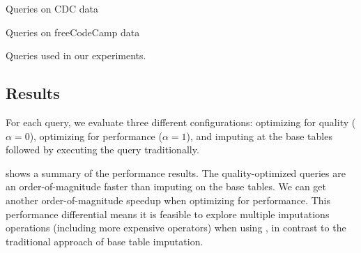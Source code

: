 \begin{table}
  \centering
  \begin{subtable}{\linewidth}
    
    \caption{Queries on CDC data}\label{fig:queries-cdc}
  \end{subtable}
  \par\medskip
  \begin{subtable}{\linewidth}
    
    \caption{Queries on freeCodeCamp data}\label{fig:queries-fcc}
  \end{subtable}
  \par\medskip
  \caption{Queries used in our experiments.}\label{fig:queries}
\end{table}

%  

\subsection{Results}\label{sec:results}

For each query, we evaluate three different configurations: \ProjectName{} optimizing for
quality ($\alpha=0$), \ProjectName{} optimizing for performance ($\alpha=1$), and imputing
at the base tables followed by executing the query traditionally. 

 shows a summary of the performance results. The quality-optimized
queries are an order-of-magnitude faster than imputing on the base tables. We can get
another order-of-magnitude speedup when optimizing for performance. This performance
differential means it is feasible
to explore multiple imputations operations (including more expensive operators) when using
\ProjectName{}, in contrast to the traditional approach of base table imputation.

